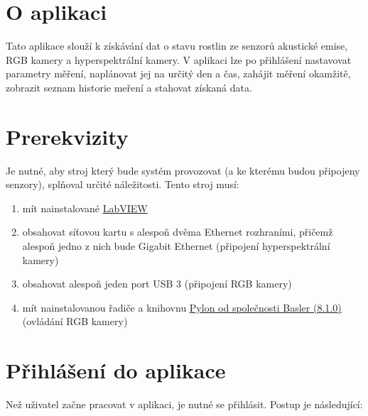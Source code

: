 \documentclass[12pt]{article}
\begin{document}
    \begin{teamwork}

        \section{O aplikaci}\label{sec:o-aplikace}

        Tato aplikace slouží k získávání dat o stavu rostlin ze senzorů akustické emise, RGB kamery a hyperspektrální kamery.
        V aplikaci lze po přihlášení nastavovat parametry měření, naplánovat jej na určitý den a čas, zahájit měření okamžitě, zobrazit seznam historie meření a stahovat získaná data.

        \section{Prerekvizity}\label{sec:prerekvizity}

        Je nutné, aby stroj který bude systém provozovat (a ke kterému budou připojeny senzory), splňoval určité náležitosti.
        Tento stroj musí:

        \begin{enumerate}
            \item mít nainstalované \href{https://www.ni.com/en/support/downloads/software-products/download.labview.html#559067}{LabVIEW}
            \item obsahovat síťovou kartu s alespoň dvěma Ethernet rozhraními, přičemž alespoň jedno z
            nich bude Gigabit Ethernet (připojení hyperspektrální kamery)
            \item obsahovat alespoň jeden port USB 3 (připojení RGB kamery)
            \item mít nainstalovanou řadiče a knihovnu \href{https://www.baslerweb.com/en/downloads/software/?downloadCategory.values.label.data=pylon}{Pylon od společnosti Basler (8.1.0)} (ovládání RGB kamery)
        \end{enumerate}


        \section{Přihlášení do aplikace}\label{sec:prihlaseni-do-aplikace}

        Než uživatel začne pracovat v aplikaci, je nutné se přihlásit.
        Postup je následující:


\end{teamwork}
\end{document}
